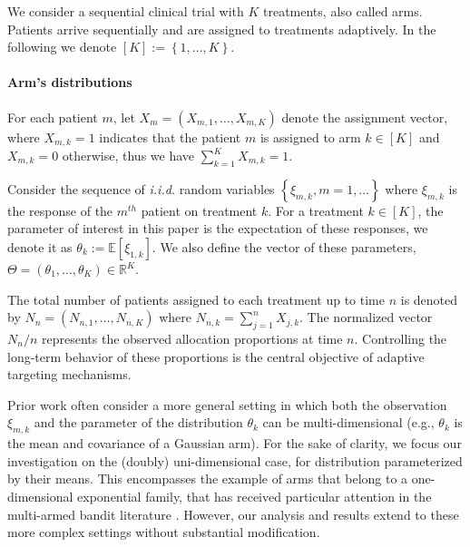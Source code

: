 We consider a sequential clinical trial with $K$ treatments, also called arms. Patients arrive sequentially and are assigned to treatments adaptively. In the following we denote \([K]:= \left\{1, \dots, K\right\}\).

\paragraph*{Arm's distributions}
For each patient $m$, let \(X_m = (X_{m,1}, \ldots, X_{m,K})\) denote the assignment vector, where $X_{m,k}=1$ indicates that the patient \(m\) is assigned to arm \(k \in [K]\) and $X_{m,k}=0$ otherwise, thus we have $\sum_{k=1}^{K} X_{m,k} = 1$.

Consider the sequence of \textit{i.i.d.} random variables \(\left\{\xi_{m,k}, m=1, \dots\right\}\)  where \(\xi_{m,k}\) is the response of the \(m^{th}\) patient on treatment \(k\). For a treatment $k \in [K]$, the parameter of interest in this paper is the expectation of these responses, we denote it as \(\theta_k := \mathbb{E}\left[\xi_{1,k}\right]\). We also define the vector of these parameters, \(\Theta = (\theta_1, \ldots, \theta_K) \in \mathbb{R}^K\).

The total number of patients assigned to each treatment up to time $n$ is denoted by \(N_n = (N_{n,1}, \ldots, N_{n,K})\) where \(N_{n,k} = \sum_{j=1}^n X_{j,k}\).
The normalized vector $N_n/n$ represents the observed allocation proportions at time $n$. Controlling the long-term behavior of these proportions is the central objective of adaptive targeting mechanisms.

\begin{remark}
Prior work often consider a more general setting in which both the observation $\xi_{m,k}$ %
and the parameter of the distribution $\theta_k$ can be multi-dimensional (e.g., $\theta_k$ is the mean and covariance of a Gaussian arm). %
For the sake of clarity, we focus our investigation on the (doubly) uni-dimensional case, for distribution parameterized by their means. This encompasses the example of arms that belong to a one-dimensional exponential family, that has received particular attention in the multi-armed bandit literature \citep{KLUCBJournal,garivier2016optimal}. However,  our analysis and results extend to these more complex settings without substantial modification.
\end{remark}

